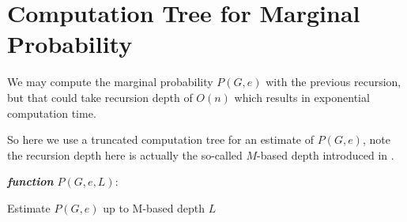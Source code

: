 
\section{Computation Tree for Marginal Probability}

We may compute the marginal probability $P(G, e)$ with the previous recursion, but
that could take recursion depth of $O(n)$ which results in exponential computation time.

So here we use a truncated computation tree for an estimate of $P(G,e)$,
note the recursion depth here is actually the so-called $M$-based depth introduced in \cite{LLY12}.

\IncMargin{1em}
\begin{algorithm}[H]
\emph{ \textbf{function} $P(G, e, L):$}
\BlankLine
{}
 \caption{Estimate $P(G,e)$ up to M-based depth $L$}
\end{algorithm}
\DecMargin{1em}

